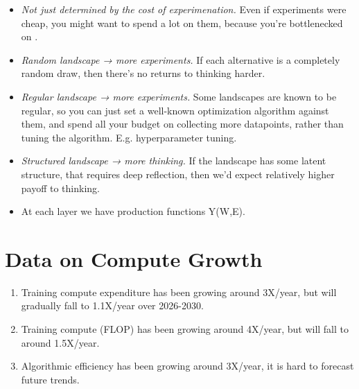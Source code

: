 \documentclass[
  11pt,
  letterpaper,
  DIV=11,
  numbers=noendperiod]{scrartcl}
\providecommand{\tightlist}{%
  \setlength{\itemsep}{0pt}\setlength{\parskip}{0pt}}
\begin{document}
\begin{description}
\tightlist
\item[Q: what determines the share spent on salary-vs-experiments?]
\hfill
\begin{itemize}
\tightlist
\item
  \emph{Not just determined by the cost of experimenation.} Even if
  experiments were cheap, you might want to spend a lot on them, because
  you're bottlenecked on .
\item
  \emph{Random landscape → more experiments.} If each alternative is a
  completely random draw, then there's no returns to thinking harder.
\item
  \emph{Regular landscape → more experiments.} Some landscapes are known
  to be regular, so you can just set a well-known optimization algorithm
  against them, and spend all your budget on collecting more datapoints,
  rather than tuning the algorithm. E.g. hyperparameter tuning.
\item
  \emph{Structured landscape → more thinking.} If the landscape has some
  latent structure, that requires deep reflection, then we'd expect
  relatively higher payoff to thinking.
\end{itemize}
\item[Q: where is AI likely to help?]
\hfill
\begin{itemize}
\tightlist
\item
  At each layer we have production functions Y(W,E).
\end{itemize}
\end{description}

\section{Data on Compute Growth}\label{data-on-compute-growth}

\begin{description}
\tightlist
\item[Best estimates.]
\hfill
\begin{enumerate}
\def\labelenumi{\arabic{enumi}.}
\tightlist
\item
  Training compute expenditure has been growing around 3X/year, but will
  gradually fall to 1.1X/year over 2026-2030.
\item
  Training compute (FLOP) has been growing around 4X/year, but will fall
  to around 1.5X/year.
\item
  Algorithmic efficiency has been growing around 3X/year, it is hard to
  forecast future trends.
\end{enumerate}
\end{description}
\end{document}
